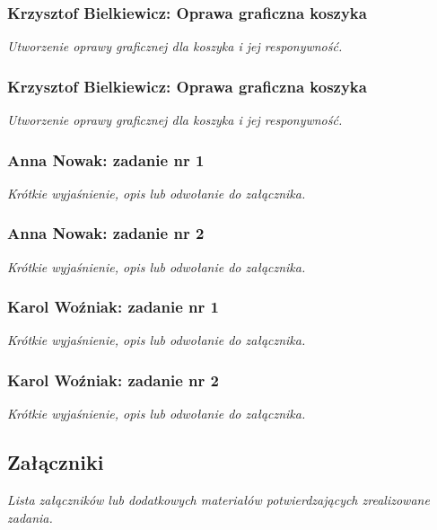 \documentclass[12pt,a4paper,oneside]{article}
\theoremstyle{definition}
\numberwithin{equation}{section}
\begin{document}
\subsubsection{Krzysztof Bielkiewicz: Oprawa graficzna koszyka}
\label{1.3.13}
\textit{Utworzenie oprawy graficznej dla koszyka i jej responywność.}

\subsubsection{Krzysztof Bielkiewicz: Oprawa graficzna koszyka}
\label{1.3.14}
\textit{Utworzenie oprawy graficznej dla koszyka i jej responywność.}


\subsubsection{Anna Nowak: zadanie nr 1}
\textit{Krótkie wyjaśnienie, opis lub odwołanie do załącznika.}
\subsubsection{Anna Nowak: zadanie nr 2}
\textit{Krótkie wyjaśnienie, opis lub odwołanie do załącznika.}


\subsubsection{Karol Woźniak: zadanie nr 1}
\textit{Krótkie wyjaśnienie, opis lub odwołanie do załącznika.}
\subsubsection{Karol Woźniak: zadanie nr 2}
\textit{Krótkie wyjaśnienie, opis lub odwołanie do załącznika.}

\subsection{Załączniki}
\textit{Lista załączników lub dodatkowych materiałów potwierdzających zrealizowane zadania.}



\renewcommand\refname{Literatura (jeżeli wymagana)}

%
%
%
\end{document}
